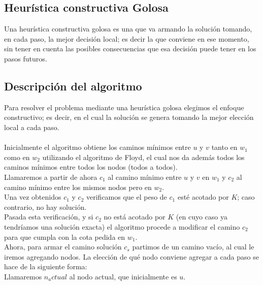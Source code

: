 \subsection{Heur\'istica constructiva Golosa}

Una heur\'istica constructiva golosa es una que va armando la soluci\'on tomando, en cada paso, la mejor decisi\'on local; es decir la que conviene en ese momento, sin tener en cuenta las posibles consecuencias que esa decisi\'on puede tener en los pasos futuros.\\

\subsection{Descripci\'on del algoritmo}

Para resolver el problema mediante una heur\'istica golosa elegimos el enfoque constructivo; es decir, en el cual la soluci\'on se genera tomando la mejor elecci\'on local a cada paso.\\\\

Inicialmente el algoritmo obtiene los caminos m\'inimos entre $u$ y $v$ tanto en $w_1$ como en $w_2$ utilizando el algoritmo de Floyd, el cual nos da adem\'as todos los caminos m\'inimos entre todos los nodos (todos a todos).\\
Llamaremos a partir de ahora $c_1$ al camino m\'inimo entre $u$ y $v$ en $w_1$ y $c_2$ al camino m\'inimo entre los mismos nodos pero en $w_2$.\\
Una vez obtenidos $c_1$ y $c_2$ verificamos que el peso de $c_1$ est\'e acotado por $K$; caso contrario, no hay soluci\'on.\\
Pasada esta verificaci\'on, y si $c_2$ no est\'a acotado por $K$ (en cuyo caso ya tendr\'iamos una soluci\'on exacta) el algoritmo procede a modificar el camino $c_2$ para que cumpla con la cota pedida en $w_1$.\\
Ahora, para armar el camino soluci\'on $c_s$ partimos de un camino vac\'io, al cual le iremos agregando nodos. La elecci\'on de qu\'e nodo conviene agregar a cada paso se hace de la siguiente forma:\\
Llamaremos $n_actual$ al nodo actual, que inicialmente es $u$.\\

